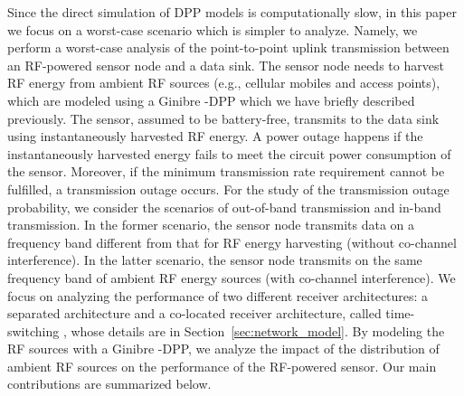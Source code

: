 \documentclass[12pt,draftclsnofoot,onecolumn]{IEEEtran}
\begin{document}
 

Since the direct simulation of DPP models is computationally slow, in this paper we focus on a worst-case scenario which is simpler to analyze. 
Namely, we perform a worst-case analysis of the point-to-point uplink transmission between an RF-powered sensor node and a data sink. The sensor node needs to harvest RF energy from ambient RF sources (e.g., cellular mobiles and access points), which are modeled using a Ginibre -DPP which we have briefly described previously. The sensor, assumed to be battery-free, transmits to the data sink using instantaneously harvested RF energy. A power outage happens if the instantaneously harvested energy fails to meet the circuit power consumption of the sensor. Moreover, if the minimum transmission rate requirement cannot be fulfilled, a transmission outage occurs. For the study of the transmission outage probability, we consider the scenarios of out-of-band transmission and in-band transmission.
In the former scenario, the sensor node transmits data on a  frequency band different from that for RF energy harvesting (without co-channel interference). In the latter scenario, the sensor node transmits on the same frequency band of ambient RF energy sources (with co-channel interference). 
We focus on analyzing the performance of two different receiver architectures: a separated architecture \cite{X.2014Lu} and a co-located receiver architecture, called time-switching \cite{ZhangRuiMIMO}, whose details are in Section~\ref{sec:network_model}. By modeling the RF sources with a Ginibre -DPP, we analyze the impact of the distribution of ambient RF sources on the performance of the RF-powered sensor. Our main contributions are summarized below.
\end{document}

